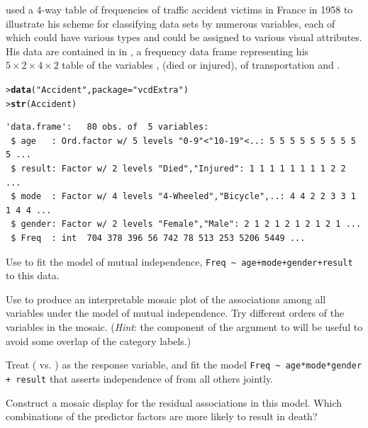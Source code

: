 \documentclass[10pt,krantz2]{krantz}\usepackage[]{graphicx}\usepackage[]{color}
\makeatletter
\newcommand{\hlstr}[1]{\textcolor[rgb]{0.192,0.494,0.8}{#1}}%
\newcommand{\hlstd}[1]{\textcolor[rgb]{0.345,0.345,0.345}{#1}}%
\newcommand{\hlkwc}[1]{\textcolor[rgb]{0.333,0.667,0.333}{#1}}%
\newcommand{\hlkwd}[1]{\textcolor[rgb]{0.737,0.353,0.396}{\textbf{#1}}}%
\newenvironment{kframe}{%
 \def\at@end@of@kframe{}%
 \ifinner\ifhmode%
  \def\at@end@of@kframe{\end{minipage}}%
  \begin{minipage}{\columnwidth}%
 \fi\fi%
 \def\FrameCommand##1{\hskip\@totalleftmargin \hskip-\fboxsep
 \colorbox{shadecolor}{##1}\hskip-\fboxsep
     \hskip-\linewidth \hskip-\@totalleftmargin \hskip\columnwidth}%
 \MakeFramed {\advance\hsize-\width
   \@totalleftmargin\z@ \linewidth\hsize
   \@setminipage}}%
 {\par\unskip\endMakeFramed%
 \at@end@of@kframe}
\newenvironment{knitrout}{}{} %
\renewenvironment{knitrout}{\small\renewcommand{\baselinestretch}{.85}}{} %
\makeatother
\begin{document}
\begin{Exercises}
  \exercise\label{lab:mosaic-accident} \citet[p. 30--31]{Bertin:83} used a 4-way table of frequencies of traffic accident victims in France in 1958
  to illustrate his scheme for classifying data sets by numerous variables, each of which could have various types
  and could be assigned to various visual attributes. His data are contained in  in ,
  a frequency data frame representing his $5 \times 2 \times 4 \times 2$ table of the variables
  ,  (died or injured),  of transportation and .
\begin{knitrout}
\color{fgcolor}\begin{kframe}
\begin{alltt}
\hlstd{> }\hlkwd{data}\hlstd{(}\hlstr{"Accident"}\hlstd{,} \hlkwc{package}\hlstd{=}\hlstr{"vcdExtra"}\hlstd{)}
\hlstd{> }\hlkwd{str}\hlstd{(Accident)}
\end{alltt}
\begin{verbatim}
'data.frame':	80 obs. of  5 variables:
 $ age   : Ord.factor w/ 5 levels "0-9"<"10-19"<..: 5 5 5 5 5 5 5 5 5 5 ...
 $ result: Factor w/ 2 levels "Died","Injured": 1 1 1 1 1 1 1 1 2 2 ...
 $ mode  : Factor w/ 4 levels "4-Wheeled","Bicycle",..: 4 4 2 2 3 3 1 1 4 4 ...
 $ gender: Factor w/ 2 levels "Female","Male": 2 1 2 1 2 1 2 1 2 1 ...
 $ Freq  : int  704 378 396 56 742 78 513 253 5206 5449 ...
\end{verbatim}
\end{kframe}
\end{knitrout}
    \begin{enumerate*}
      \item Use  to fit the model of mutual independence, \verb|Freq ~ age+mode+gender+result| to
      this data.
      \item Use  to produce an interpretable mosaic plot of the associations among all variables under the
      model of mutual independence.  Try different orders of the variables in the mosaic.  (\emph{Hint}: the 
       component of the 
       argument to  will be useful to avoid some overlap of the category labels.)
      \item Treat  ( vs. ) as the response variable, and fit the model
      \verb|Freq ~ age*mode*gender + result| that asserts independence of  from all others jointly.
      \item Construct a mosaic display for the residual associations in this model.  Which combinations of the
      predictor factors are more likely to result in death?
    \end{enumerate*}


\end{Exercises}
\end{document}
